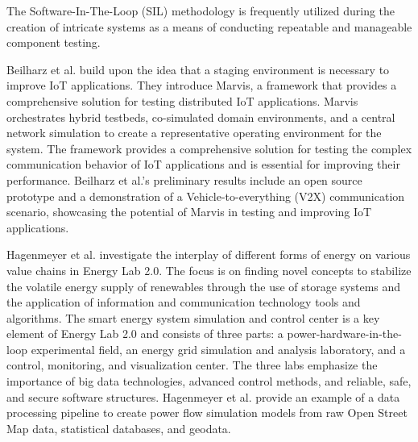 The Software-In-The-Loop (SIL) methodology is frequently utilized during the
creation of intricate systems as a means of conducting repeatable and manageable
component testing.

Beilharz et al. \cite{beilharz2021} build upon the idea that a staging
environment is necessary to improve IoT applications. They introduce Marvis, a
framework that provides a comprehensive solution for testing distributed IoT
applications. Marvis orchestrates hybrid testbeds, co-simulated domain
environments, and a central network simulation to create a representative
operating environment for the system. The framework provides a comprehensive
solution for testing the complex communication behavior of IoT applications and
is essential for improving their performance. Beilharz et al.'s preliminary
results include an open source prototype and a demonstration of a
Vehicle-to-everything (V2X) communication scenario, showcasing the potential of
Marvis in testing and improving IoT applications.

Hagenmeyer et al. \cite{hagenmeyer2016} investigate the interplay of different
forms of energy on various value chains in Energy Lab 2.0. The focus is on
finding novel concepts to stabilize the volatile energy supply of renewables
through the use of storage systems and the application of information and
communication technology tools and algorithms. The smart energy system
simulation and control center is a key element of Energy Lab 2.0 and consists of
three parts: a power-hardware-in-the-loop experimental field, an energy grid
simulation and analysis laboratory, and a control, monitoring, and visualization
center. The three labs emphasize the importance of big data technologies,
advanced control methods, and reliable, safe, and secure software structures.
Hagenmeyer et al. provide an example of a data processing pipeline to create
power flow simulation models from raw Open Street Map data, statistical
databases, and geodata.
